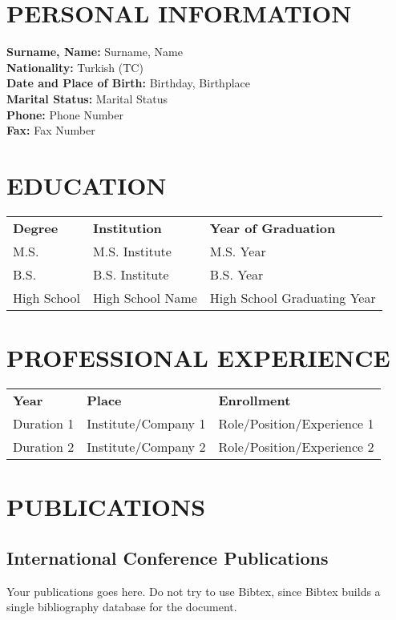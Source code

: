 \curriculumvitae
\label{chapter:vita}

\section*{\uppercase{Personal Information}}

\textbf{Surname, Name: } Surname, Name\\
\textbf{Nationality:} Turkish (TC) \\
\textbf{Date and Place of Birth:} Birthday, Birthplace\\
\textbf{Marital Status:} Marital Status \\
\textbf{Phone:} Phone Number \\
\textbf{Fax:} Fax Number \\

\section*{\uppercase{Education}}

\begin{tabular}{lll}
\textbf{Degree} & \textbf{Institution} & \textbf{Year of Graduation} \\
M.S. & M.S. Institute & M.S. Year \\
B.S. & B.S. Institute & B.S. Year \\
High School & High School Name & High School Graduating Year
\end{tabular}

\section*{\uppercase{Professional Experience}}

\begin{tabular}{lll}
\textbf{Year} & \textbf{Place} & \textbf{Enrollment} \\
Duration 1 & Institute/Company 1 & Role/Position/Experience 1 \\
Duration 2 & Institute/Company 2 & Role/Position/Experience 2 
\end{tabular}

\section*{\uppercase{Publications}}
\subsection*{International Conference Publications}
Your publications goes here. Do not try to use Bibtex, since Bibtex builds a single bibliography
database for the document.
